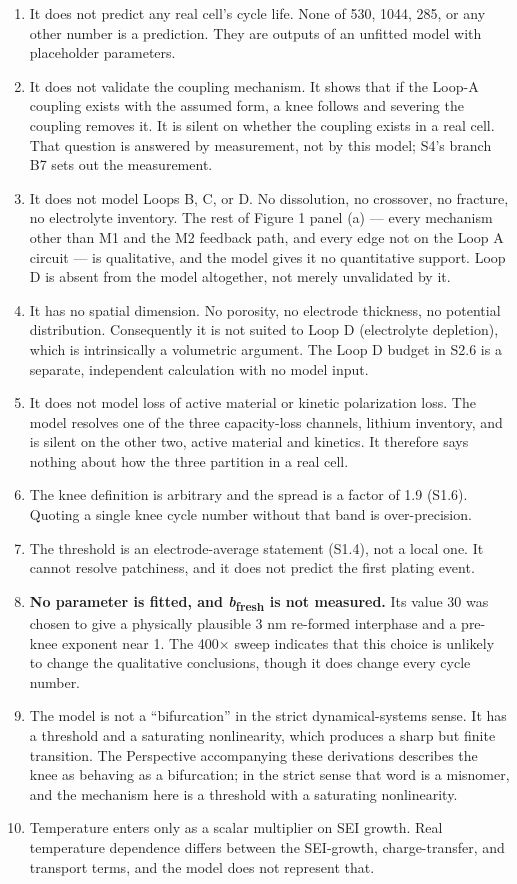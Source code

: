 \documentclass[11pt,a4paper]{article}
\begin{document}
\begin{enumerate}
  \item It does not predict any real cell's cycle life. None of 530, 1044, 285, or any other number is a prediction. They are outputs of an unfitted model with placeholder parameters.
  \item It does not validate the coupling mechanism. It shows that if the Loop-A coupling exists with the assumed form, a knee follows and severing the coupling removes it. It is silent on whether the coupling exists in a real cell. That question is answered by measurement, not by this model; S4's branch B7 sets out the measurement.
  \item It does not model Loops B, C, or D. No dissolution, no crossover, no fracture, no electrolyte inventory. The rest of Figure 1 panel (a) --- every mechanism other than M1 and the M2 feedback path, and every edge not on the Loop A circuit --- is qualitative, and the model gives it no quantitative support. Loop D is absent from the model altogether, not merely unvalidated by it.
  \item It has no spatial dimension. No porosity, no electrode thickness, no potential distribution. Consequently it is not suited to Loop D (electrolyte depletion), which is intrinsically a volumetric argument. The Loop D budget in S2.6 is a separate, independent calculation with no model input.
  \item It does not model loss of active material or kinetic polarization loss. The model resolves one of the three capacity-loss channels, lithium inventory, and is silent on the other two, active material and kinetics. It therefore says nothing about how the three partition in a real cell.
  \item The knee definition is arbitrary and the spread is a factor of 1.9 (S1.6). Quoting a single knee cycle number without that band is over-precision.
  \item The threshold is an electrode-average statement (S1.4), not a local one. It cannot resolve patchiness, and it does not predict the first plating event.
  \item \textbf{No parameter is fitted, and \emph{b}\textsubscript{fresh} is not measured.} Its value 30 was chosen to give a physically plausible 3 nm re-formed interphase and a pre-knee exponent near 1. The 400\ensuremath{\times} sweep indicates that this choice is unlikely to change the qualitative conclusions, though it does change every cycle number.
  \item The model is not a \textquotedblleft{}bifurcation\textquotedblright{} in the strict dynamical-systems sense. It has a threshold and a saturating nonlinearity, which produces a sharp but finite transition. The Perspective accompanying these derivations describes the knee as behaving as a bifurcation; in the strict sense that word is a misnomer, and the mechanism here is a threshold with a saturating nonlinearity.
  \item Temperature enters only as a scalar multiplier on SEI growth. Real temperature dependence differs between the SEI-growth, charge-transfer, and transport terms, and the model does not represent that.
\end{enumerate}
\end{document}
